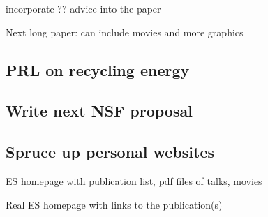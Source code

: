 incorporate ?? advice into the paper

Next long paper: can include movies and more graphics

\subsection{PRL on recycling energy}

\subsection{Write next NSF proposal }

\subsection{Spruce up personal websites}

ES homepage with publication list, pdf files of talks, movies

Real ES homepage with links to the publication(s)
